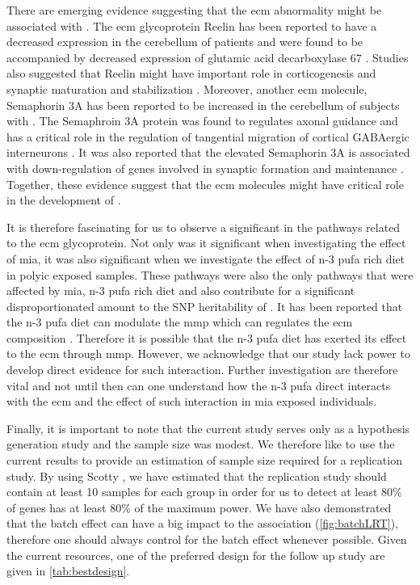 There are emerging evidence suggesting that the \gls{ecm} abnormality might be associated with  \citep{Berretta2012}.
The \gls{ecm} glycoprotein Reelin has been reported to have a decreased expression in the cerebellum of  patients \citep{Maloku2010} and were found to be accompanied by decreased expression of glutamic acid decarboxylase 67 \citep{Costa2001}.
Studies also suggested that Reelin might have important role in corticogenesis and synaptic maturation and stabilization \citep{Berretta2012}.
Moreover, another \gls{ecm} molecule, Semaphorin 3A has been reported to be increased in the cerebellum of subjects with  \citep{Eastwood2003}.
The Semaphroin 3A protein was found to regulates axonal guidance and has a critical role in the  regulation of tangential migration of cortical GABAergic interneurons \citep{Zimmer2010}.
It was also reported that the elevated Semaphorin 3A is associated with down-regulation of genes involved in synaptic formation and maintenance \citep{Eastwood2003}.
Together, these evidence suggest that the \gls{ecm} molecules might have critical role in the development of .

It is therefore fascinating for us to observe a significant in the pathways related to the \gls{ecm} glycoprotein.
Not only was it significant when investigating the effect of \gls{mia}, it was also significant when we investigate the effect of n-3 \gls{pufa} rich diet in \gls{polyic} exposed samples.
These pathways were also the only pathways that were affected by \gls{mia}, n-3 \gls{pufa} rich diet and also contribute for a significant disproportionated amount to the \gls{SNP} heritability of .
It has been reported that the n-3 \gls{pufa} diet can modulate the \gls{mmp} \citep{Derosa2009,Kavazos2015} which can regulates the \gls{ecm} composition \citep{Stamenkovic2003}.
Therefore it is possible that the n-3 \gls{pufa} diet has exerted its effect to the \gls{ecm} through \gls{mmp}.
However, we acknowledge that our study lack power to develop direct evidence for such interaction. 
Further investigation are therefore vital and not until then can one understand how the n-3 \gls{pufa} direct interacts with the \gls{ecm} and the effect of such interaction in \gls{mia} exposed individuals.

Finally, it is important to note that the current study serves only as a hypothesis generation study and the sample size was modest. 
We therefore like to use the current results to provide an estimation of sample size required for a replication study.
By using Scotty \citep{Busby2013}, we have estimated that the replication study should contain at least 10 samples for each group in order for us to detect at least 80\% of genes has at least 80\% of the maximum power. 
We have also demonstrated that the batch effect can have a big impact to the association (\cref{fig:batchLRT}), therefore one should always control for the batch effect whenever possible.
Given the current resources, one of the preferred design for the follow up study are given in \cref{tab:bestdesign}.

